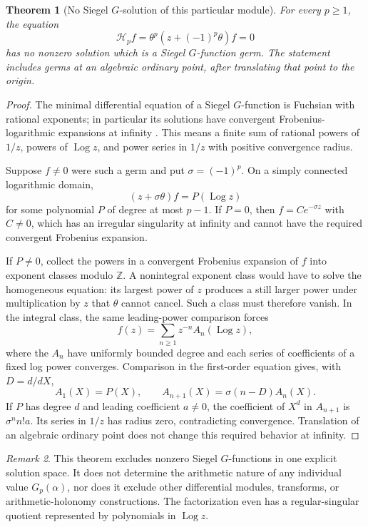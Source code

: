 \documentclass[11pt,a4paper]{article}
\newtheorem{theorem}{Theorem}[section]
\theoremstyle{definition}
\theoremstyle{remark}
\newtheorem{remark}[theorem]{Remark}
\newcommand{\Z}{\mathbb Z}
\DeclareMathOperator{\Log}{Log}
\numberwithin{equation}{section}
\begin{document}
\begin{theorem}[No Siegel $G$-solution of this particular module]
\label{p7:thm:no-siegel}
For every $p\ge1$, the equation
\[
 \mathcal H_pf=\theta^p(z+(-1)^p\theta)f=0
\]
has no nonzero solution which is a Siegel $G$-function germ. The statement
includes germs at an algebraic ordinary point, after translating that
point to the origin.
\end{theorem}
\begin{proof}
The minimal differential equation of a Siegel $G$-function is Fuchsian
with rational exponents; in particular its solutions have convergent
Frobenius-logarithmic expansions at infinity
\cite[Theorem 6 and the paragraph following it]{p7:FR2014}. This means a
finite sum of rational powers of $1/z$, powers of $\Log z$, and power
series in $1/z$ with positive convergence radius.

Suppose $f\ne0$ were such a germ and put $\sigma=(-1)^p$.
On a simply connected logarithmic domain,
\[
 (z+\sigma\theta)f=P(\Log z)
\]
for some polynomial $P$ of degree at most $p-1$.
If $P=0$, then $f=Ce^{-\sigma z}$ with $C\ne0$, which has an irregular
singularity at infinity and cannot have the required convergent
Frobenius expansion.

If $P\ne0$, collect the powers in a convergent Frobenius expansion of
$f$ into exponent classes modulo $\Z$. A nonintegral exponent class
would have to solve the homogeneous equation: its largest power of
$z$ produces a still larger power under multiplication by $z$ that
$\theta$ cannot cancel. Such a class must therefore vanish.
In the integral class, the same leading-power comparison forces
\[
 f(z)=\sum_{n\ge1}z^{-n}A_n(\Log z),
\]
where the $A_n$ have uniformly bounded degree and each series of
coefficients of a fixed log power converges. Comparison in the
first-order equation gives, with $D=d/dX$,
\begin{equation}
\label{p7:eq:factorial-rec}
 A_1(X)=P(X),\qquad
 A_{n+1}(X)=\sigma(n-D)A_n(X).
\end{equation}
If $P$ has degree $d$ and leading coefficient $a\ne0$, the coefficient
of $X^d$ in $A_{n+1}$ is $\sigma^n n!a$. Its series in $1/z$ has radius
zero, contradicting convergence. Translation of an algebraic ordinary
point does not change this required behavior at infinity.
\end{proof}

\begin{remark}
This theorem excludes nonzero Siegel $G$-functions in one explicit
solution space. It does not determine the arithmetic nature of any
individual value $G_p(\alpha)$, nor does it exclude other differential
modules, transforms, or arithmetic-holonomy constructions. The
factorization even has a regular-singular quotient represented by
polynomials in $\Log z$.
\end{remark}
\end{document}
